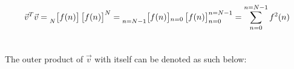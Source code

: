 \documentclass{article}
\begin{document}
\begin{align*}
    \vec{v}^{T}\vec{v} = \prescript{}{N}{\begin{bmatrix} f(n) \end{bmatrix}}\begin{bmatrix} f(n) \end{bmatrix}^{N}
                       = \prescript{}{n = N - 1}{\begin{bmatrix} f(n) \end{bmatrix}}_{n = 0}\begin{bmatrix} f(n) \end{bmatrix}^{n = N - 1}_{n = 0} = \sum^{n = N - 1}_{n = 0}f^{2}(n) \\ \\
  \end{align*}

The outer product of $\vec{v}$ with itself can be denoted as such below:
\end{document}
